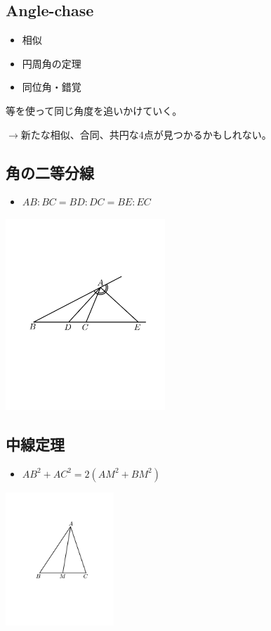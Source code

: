 \documentclass[uplatex,fleqn]{jsbook}
\begin{document}
\subsection{Angle-chase}
\begin{itemize}
    \item 相似
    \item 円周角の定理
    \item 同位角・錯覚
\end{itemize}

等を使って同じ角度を追いかけていく。

$\rightarrow$新たな相似、合同、共円な4点が見つかるかもしれない。

\subsection{角の二等分線}
\begin{itemize}
    \item $AB:BC=BD:DC=BE:EC$
\end{itemize}

\includegraphics[clip,width=6cm]{figures/nitobun.pdf}

\subsection{中線定理}
\begin{itemize}
    \item $AB^2+AC^2=2\left(AM^2+BM^2\right)$
\end{itemize}

\includegraphics[clip,height=5cm]{figures/chusen.pdf}
\end{document}
